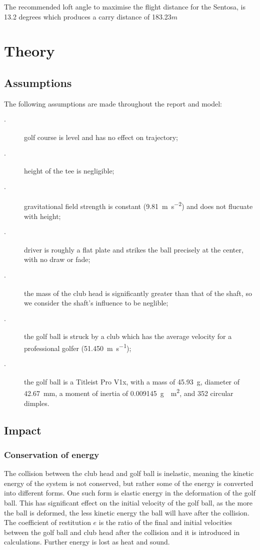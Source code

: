 \documentclass[12pt]{article}
\begin{document}
The recommended loft angle to maximise the flight distance for the Sentosa, is 13.2 degrees which produces a carry distance of 183.23$m$

\section{Theory}

\subsection{Assumptions}
The following assumptions are made throughout the report and model:
\begin{description}
  \item[$\cdot$] golf course is level and has no effect on trajectory;
  \item[$\cdot$] height of the tee is negligible;
  \item[$\cdot$] gravitational field strength is constant (\SI{9.81}{\metre\per\second^{2}}) and does not flucuate with height;
  \item[$\cdot$] driver is roughly a flat plate and strikes the ball precisely at the center, with no draw or fade;
  \item[$\cdot$] the mass of the club head is significantly greater than that of the shaft, so we consider the shaft's influence to be neglible;
  \item[$\cdot$] the golf ball is struck by a club which has the average velocity for a professional golfer (51.4\SI{50}{\metre\per\second});
  \item[$\cdot$] the golf ball is a Titleist Pro V1x, with a mass of \SI{45.93}{\gram}, diameter of \SI{42.67}{\milli\metre}, a moment of inertia of \SI{0.009145}{\gram\cdot\metre^2}, and 352 circular dimples.
\end{description}

\subsection{Impact}
\subsubsection{Conservation of energy}
The collision between the club head and golf ball is inelastic, meaning the kinetic energy of the system is not conserved, but rather some of the energy is converted into different forms. One such form is elastic energy in the deformation of the golf ball. This has significant effect on the initial velocity of the golf ball, as the more the ball is deformed, the less kinetic energy the ball will have after the collision. The coefficient of restitution $e$ is the ratio of the final and initial velocities between the golf ball and club head after the collision and it is introduced in calculations. Further energy is lost as heat and sound.
\end{document}

